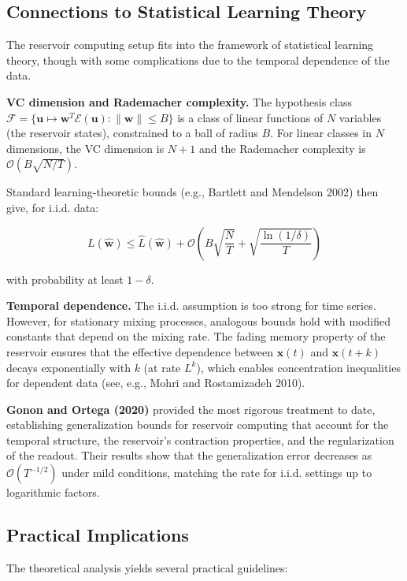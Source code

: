 \subsection{Connections to Statistical Learning Theory}\label{sec:15.8.4}

The reservoir computing setup fits into the framework of statistical learning theory,
though with some complications due to the temporal dependence of the data.

\textbf{VC dimension and Rademacher complexity.} The hypothesis class
$\mathcal{F} = \{\mathbf{u} \mapsto \mathbf{w}^T \mathcal{E}(\mathbf{u}) : \|\mathbf{w}\| \leq B\}$
is a class of linear functions of $N$ variables (the reservoir states), constrained
to a ball of radius $B$. For linear classes in $N$ dimensions, the VC dimension is
$N + 1$ and the Rademacher complexity is $\mathcal{O}(B\sqrt{N/T})$.

Standard learning-theoretic bounds (e.g., Bartlett and Mendelson 2002) then give, for
i.i.d. data:

\[
L(\hat{\mathbf{w}}) \leq \hat{L}(\hat{\mathbf{w}}) + \mathcal{O}\left(B\sqrt{\frac{N}{T}} + \sqrt{\frac{\ln(1/\delta)}{T}}\right)
\]

with probability at least $1 - \delta$.

\textbf{Temporal dependence.} The i.i.d. assumption is too strong for time series. However,
for stationary mixing processes, analogous bounds hold with modified constants that
depend on the mixing rate. The fading memory property of the reservoir ensures that
the effective dependence between $\mathbf{x}(t)$ and $\mathbf{x}(t+k)$ decays
exponentially with $k$ (at rate $L^k$), which enables concentration inequalities for
dependent data (see, e.g., Mohri and Rostamizadeh 2010).

\textbf{Gonon and Ortega (2020)} provided the most rigorous treatment to date, establishing
generalization bounds for reservoir computing that account for the temporal structure,
the reservoir's contraction properties, and the regularization of the readout. Their
results show that the generalization error decreases as $\mathcal{O}(T^{-1/2})$ under
mild conditions, matching the rate for i.i.d. settings up to logarithmic factors.

\subsection{Practical Implications}\label{sec:15.8.5}

The theoretical analysis yields several practical guidelines:


